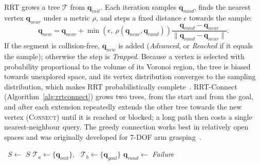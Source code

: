 \documentclass[12pt,a4paper]{article}
\begin{document}
RRT grows a tree $\mathcal{T}$ from $\mathbf{q}_{init}$. Each iteration samples
$\mathbf{q}_{rand}$, finds the nearest vertex $\mathbf{q}_{near}$ under a metric $\rho$, and steps a
fixed distance $\epsilon$ towards the sample:
\begin{equation}
    \mathbf{q}_{new}=\mathbf{q}_{near}+\min\!\left(\epsilon,\ \rho(\mathbf{q}_{near},\mathbf{q}_{rand})\right)
    \frac{\mathbf{q}_{rand}-\mathbf{q}_{near}}{\|\mathbf{q}_{rand}-\mathbf{q}_{near}\|}.
\end{equation}
If the segment is collision-free, $\mathbf{q}_{new}$ is added (\emph{Advanced}, or \emph{Reached} if it
equals the sample); otherwise the step is \emph{Trapped}. Because a vertex is selected with probability
proportional to the volume of its Voronoi region, the tree is biased towards unexplored space, and its
vertex distribution converges to the sampling distribution, which makes RRT probabilistically
complete~\cite{kuffner2000}. RRT-Connect (Algorithm~\ref{alg:rrtconnect}) grows two trees, from the
start and from the goal, and after each extension repeatedly extends the other tree towards the new
vertex (\textsc{Connect}) until it is reached or blocked; a long path then costs a single
nearest-neighbour query. The greedy connection works best in relatively open spaces and was originally
developed for 7-DOF arm grasping~\cite{kuffner2000}.

\begin{algorithm}[H]
\caption{RRT-Connect~\cite{kuffner2000}}
\label{alg:rrtconnect}
\begin{algorithmic}[1]
    \Repeat \ $S\gets$ 
    \State \Return $S$
\EndFunction
{}
    \State $\mathcal{T}_a\gets\{\mathbf{q}_{init}\}$, \ $\mathcal{T}_b\gets\{\mathbf{q}_{goal}\}$
        \State $\mathbf{q}_{rand}\gets$ 
                \State \Return {}
            \EndIf
        \EndIf
        \State {}
    \EndFor
    \State \Return \emph{Failure}
\EndFunction
\end{algorithmic}
\end{algorithm}
\end{document}
